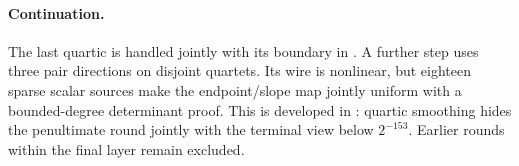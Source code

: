 \documentclass[11pt]{article}
\begin{document}
\paragraph{Continuation.} The last quartic is handled jointly with its boundary in . A further step uses three pair directions on disjoint quartets. Its wire is nonlinear, but eighteen sparse scalar sources make the endpoint/slope map jointly uniform with a bounded-degree determinant proof. This is developed in : quartic smoothing hides the penultimate round jointly with the terminal view below $2^{-153}$. Earlier rounds within the final layer remain excluded.
\end{document}
